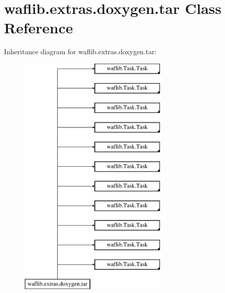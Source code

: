 \hypertarget{classwaflib_1_1extras_1_1doxygen_1_1tar}{}\section{waflib.\+extras.\+doxygen.\+tar Class Reference}
\label{classwaflib_1_1extras_1_1doxygen_1_1tar}
Inheritance diagram for waflib.\+extras.\+doxygen.\+tar\+:\begin{figure}[H]
\begin{center}
\leavevmode
\includegraphics[height=12.000000cm]{classwaflib_1_1extras_1_1doxygen_1_1tar}
\end{center}
\end{figure}
